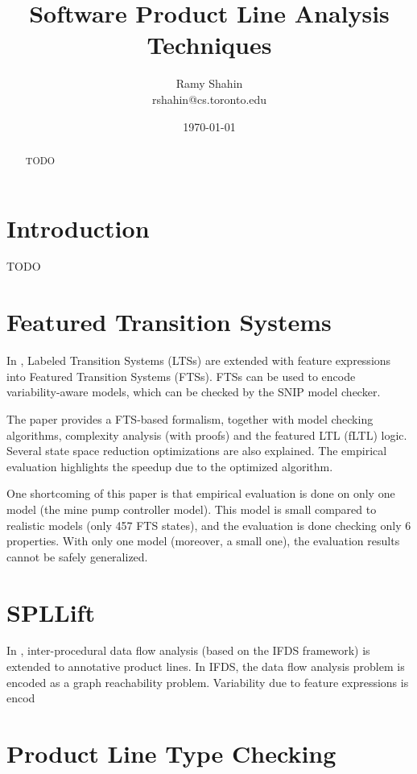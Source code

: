 \documentclass[11pt]{article}
\title{Software Product Line Analysis Techniques}
\author{Ramy Shahin \\ rshahin@cs.toronto.edu}
\date{\today}                                           %
\begin{document}
\maketitle

\begin{abstract}
TODO
\end{abstract}

\section{Introduction}
TODO

\section{Featured Transition Systems}
\cite{Classen:2013}

In \cite{Classen:2013}, Labeled Transition Systems (LTSs) are extended with feature expressions into Featured Transition Systems (FTSs). FTSs can be used to encode variability-aware models, which can be checked by the SNIP model checker. 

The paper provides a FTS-based formalism, together with model checking algorithms, complexity analysis (with proofs) and the featured LTL (fLTL) logic. Several state space reduction optimizations are also explained. The empirical evaluation highlights the speedup due to the optimized algorithm.

One shortcoming of this paper is that empirical evaluation is done on only one model (the mine pump controller model). This model is small compared to realistic models (only 457 FTS states), and the evaluation is done checking only 6 properties. With only one model (moreover, a small one), the evaluation results cannot be safely generalized. 
 
\section{SPLLift}
\cite{Bodden:2013}

In \cite{Bodden:2013}, inter-procedural data flow analysis (based on the IFDS framework) is extended to annotative product lines. In IFDS, the data flow analysis problem is encoded as a graph reachability problem. Variability due to feature expressions is encod 

\section{Product Line Type Checking}
\end{document}
